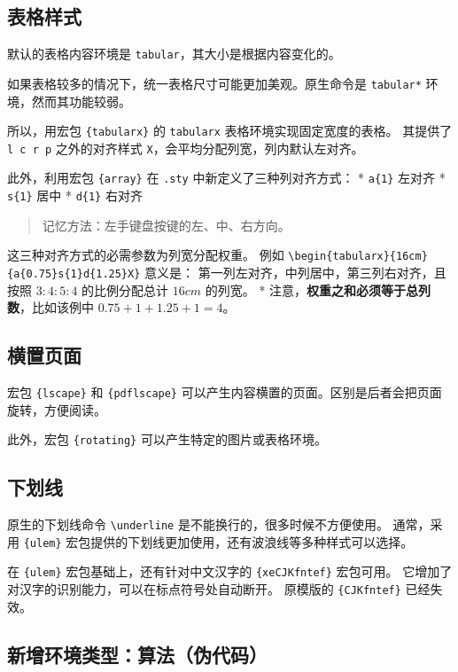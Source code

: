 \documentclass[../Main/thesis.tex]{subfiles}
\begin{document}
\subsection{表格样式}

默认的表格内容环境是 \texttt{tabular}，其大小是根据内容变化的。

如果表格较多的情况下，统一表格尺寸可能更加美观。原生命令是
\texttt{tabular*} 环境，然而其功能较弱。

所以，用宏包 \texttt{\{tabularx\}} 的 \texttt{tabularx}
表格环境实现固定宽度的表格。 其提供了 \texttt{l\ c\ r\ p} 之外的对齐样式
\texttt{X}，会平均分配列宽，列内默认左对齐。

此外，利用宏包 \texttt{\{array\}} 在 \texttt{.sty}
中新定义了三种列对齐方式： * \texttt{a\{1\}} 左对齐 * \texttt{s\{1\}}
居中 * \texttt{d\{1\}} 右对齐

\begin{quote}
记忆方法：左手键盘按键的左、中、右方向。
\end{quote}

这三种对齐方式的必需参数为列宽分配权重。 例如
\texttt{\textbackslash{}begin\{tabularx\}\{16cm\}\{a\{0.75\}s\{1\}d\{1.25\}X\}}
意义是： 第一列左对齐，中列居中，第三列右对齐，且按照 \(3:4:5:4\)
的比例分配总计 \(16cm\) 的列宽。 *
注意，\textbf{权重之和必须等于总列数}，比如该例中 \(0.75+1+1.25+1=4\)。

\subsection{横置页面}

宏包 \texttt{\{lscape\}} 和 \texttt{\{pdflscape\}}
可以产生内容横置的页面。区别是后者会把页面旋转，方便阅读。

此外，宏包 \texttt{\{rotating\}} 可以产生特定的图片或表格环境。

\subsection{下划线}

原生的下划线命令 \texttt{\textbackslash{}underline}
是不能换行的，很多时候不方便使用。 通常，采用 \texttt{\{ulem\}}
宏包提供的下划线更加使用，还有波浪线等多种样式可以选择。

在 \texttt{\{ulem\}} 宏包基础上，还有针对中文汉字的
\texttt{\{xeCJKfntef\}} 宏包可用。
它增加了对汉字的识别能力，可以在标点符号处自动断开。 原模版的
\texttt{\{CJKfntef\}} 已经失效。

\subsection{新增环境类型：算法（伪代码）}
\end{document}
